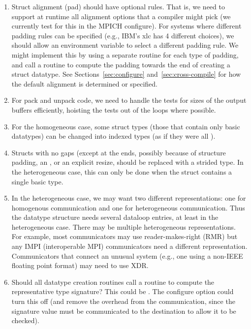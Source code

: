 \documentclass{article}
\begin{document}
\begin{enumerate}
\item Struct alignment (pad) should have optional rules.  That is, we
   need to support at runtime all alignment options that a compiler might pick
   (we currently test for this in the MPICH configure).  For systems
   where different padding rules can be specified (e.g., IBM's xlc has 4
   different choices), we should allow an environment variable to
   select a different padding rule.  We might implement this by using
   a separate routine for each type of padding, and call a routine to
   compute the padding towards the end of creating a struct datatype.
   See Sections~\ref{sec:configure} and~\ref{sec:cross-compile} for
   how the default alignment is determined or specified.

\item For pack and unpack code, we need to handle the tests for sizes of
    the output buffers efficiently, hoisting the tests out of the
    loops where possible.  

\item For the homogeneous case, some struct types (those that contain
    only basic datatypes) can be changed into indexed types (as if
    they were all ).

\item Structs with no gaps (except at the ends, possibly because of 
    structure padding, an , or an explicit resize,
    should be replaced with a strided type.  In the heterogeneous
    case, this can only be done when the struct contains a single
    basic type.

\item In the heterogeneous case, we may want two different
    representations: one for homogenous communication and one for
    heterogeneous communication.  Thus the datatype structure needs
    several dataloop entries, at least in the heterogeneous case.
    There may be multiple heterogeneous representations.  For example, 
    most communicators may use reader-makes-right (RMR) \cite{Zhou:1995:RMR}
    but any IMPI (interoperable MPI) communicators need a different
    representation.  Communicators that connect an unusual system
    (e.g., one using a non-IEEE floating point format) may need to use
    XDR.  

\item Should all datatype creation routines call a routine to compute
the representative type signature?  This could be
.  The configure option
 could turn this off (and remove
the overhead from the communication, since the signature value must be
communicated to the destination to allow it to be checked).
\end{enumerate}
\end{document}

